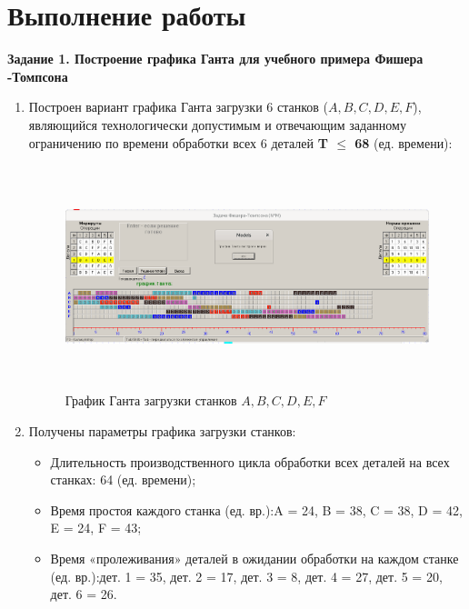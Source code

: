 \documentclass[a4paper,12pt]{article}
\begin{document}
\section{\normalsize{Выполнение работы}}
\begin{flushleft}
\textbf{Задание 1. Построение графика Ганта для учебного примера Фишера
-Томпсона}
  \justify
  \begin{enumerate}
    \item Построен вариант графика Ганта загрузки 6 станков ($A, B, C, D, E, F$), являющийся технологически допустимым и отвечающим заданному ограничению по времени обработки всех 6 деталей \textbf{T $\le$ 68} (ед. времени):
    \begin{figure}[H]
      \includegraphics[width=15.25cm,height=6.5cm]{heuristics.png}
      \centering
      \caption{\small{График Ганта загрузки станков $A, B, C, D, E, F$}}
  \end{figure}
    \item Получены параметры графика загрузки станков:
    \begin{itemize}
      \item Длительность производственного цикла обработки всех деталей на всех станках: 64 (ед. времени);
      \item Время простоя каждого станка (ед. вр.):\newline A = 24, B = 38, C = 38, D = 42, E = 24, F = 43;
      \item Время «пролеживания» деталей в ожидании обработки на каждом станке (ед. вр.):\newline дет. 1 = 35, дет. 2 = 17, дет. 3 = 8, дет. 4 = 27, дет. 5 = 20, дет. 6 = 26.
    \end{itemize}
  \end{enumerate}
\end{flushleft}
\newpage
\end{document}
